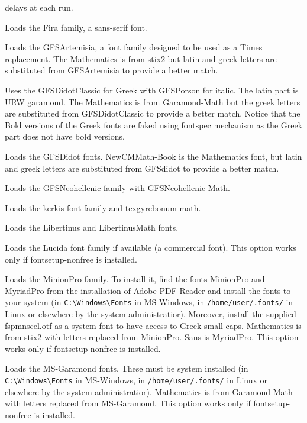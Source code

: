 \documentclass{book}
\begin{document}
\begin{description}
	delays at each run.
    \item[fira] Loads the Fira family, a sans-serif font.
    \item[gfsartemisia] Loads the GFSArtemisia, a font family designed to be used
      as a Times replacement. The Mathematics is from stix2 but latin
      and greek letters are substituted from GFSArtemisia to provide a better match.
    \item[gfsdidotclassic] Uses the GFSDidotClassic for Greek with GFSPorson for italic.
      The latin part is URW garamond. The Mathematics is from Garamond-Math but the greek
      letters are substituted from GFSDidotClassic to provide a better match. Notice that
      the Bold versions of the Greek fonts are faked using fontspec mechanism as
      the Greek part does not have bold versions.
    \item[gfsdidot] Loads the GFSDidot fonts. NewCMMath-Book is the Mathematics font, but latin
      and greek letters are substituted from GFSdidot to provide a better match.
    \item[gfsneohellenic] Loads the GFSNeohellenic family with GFSNeohellenic-Math.
    \item[kerkis] Loads the kerkis font family and texgyrebonum-math.
    \item[libertinus] Loads the Libertinus and LibertinusMath fonts.
    \item[lucida] Loads the Lucida font family if available (a commercial font). This option works only if
    fontsetup-nonfree is installed.
    \item[minion] Loads the MinionPro family. To install it, find the fonts MinionPro and
      MyriadPro from the installation of Adobe PDF Reader and install the fonts to your system
      (in \verb|C:\Windows\Fonts| in MS-Windows, in \verb|/home/user/.fonts/| in Linux
      or elsewhere by the system administratior). Moreover, install the supplied
      fspmnscel.otf as a system font to have access to Greek small caps.
      Mathematics is from stix2
      with letters replaced from MinionPro. Sans is MyriadPro. This option works only if
    fontsetup-nonfree is installed.
    \item[msgaramond] Loads the MS-Garamond fonts. These must be system installed
      (in \verb|C:\Windows\Fonts| in MS-Windows, in \verb|/home/user/.fonts/| in Linux
      or elsewhere by the system administratior). Mathematics is from
      Garamond-Math with letters replaced
      from MS-Garamond. This option works only if
    fontsetup-nonfree is installed.

\end{description}
\end{document}
